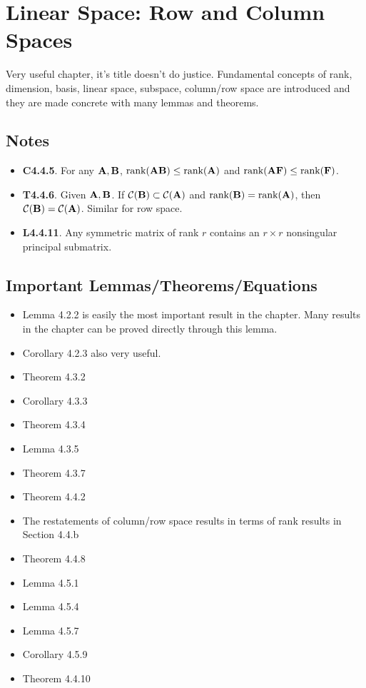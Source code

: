 \documentclass[a4paper, oneside]{book}
\begin{document}
\chapter{Linear Space: Row and Column Spaces}

Very useful chapter, it's title doesn't do justice. Fundamental concepts of rank, dimension, basis, linear space, subspace, column/row space are introduced and they are made concrete with many lemmas and theorems.


\section{Notes}
\begin{itemize}
\item \textbf{C4.4.5}. For any $\mathbf{A}, \mathbf{B}$, $\text{rank}(\mathbf{AB})\le \text{rank}(\mathbf A)$ and $\text{rank}(\mathbf{AF})\le \text{rank}(\mathbf F)$.
\item \textbf{T4.4.6}. Given $\mathbf{A,B}$. If $\mathcal{C}(\mathbf B) \subset \mathcal{C}(\mathbf A)$ and $\text{rank}(\mathbf B) = \text{rank}(\mathbf A)$, then $\mathcal{C}(\mathbf B)=\mathcal{C}(\mathbf A)$. Similar for row space.
\item \textbf{L4.4.11}. Any symmetric matrix of rank $r$ contains an $r\times r$ nonsingular principal submatrix.
\end{itemize}

\section{Important Lemmas/Theorems/Equations}
\begin{itemize}
\item Lemma 4.2.2 is easily the most important result in the chapter. Many results in the chapter can be proved directly through this lemma.
\item Corollary 4.2.3 also very useful.
\item Theorem 4.3.2
\item Corollary 4.3.3
\item Theorem 4.3.4
\item Lemma 4.3.5
\item Theorem 4.3.7
\item Theorem 4.4.2
\item The restatements of column/row space results in terms of rank results in Section 4.4.b
\item Theorem 4.4.8
\item Lemma 4.5.1
\item Lemma 4.5.4
\item Lemma 4.5.7
\item Corollary 4.5.9
\item Theorem 4.4.10
\end{itemize}
\end{document}
